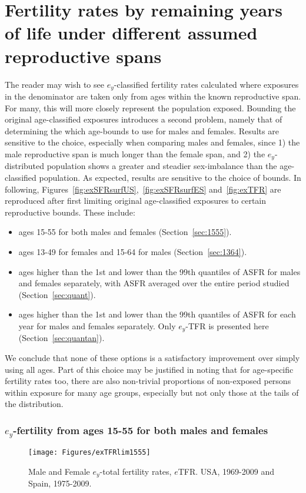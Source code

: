 % 

\chapter{Fertility rates by remaining years of life under different assumed
reproductive spans}
\label{Appendix:reprospans}
The reader may wish to see $e_y$-classified fertility rates calculated
where exposures in the denominator are taken only from ages within the known
reproductive span. For many, this will more closely represent the population exposed. Bounding the
original age-classified exposures introduces a second problem, namely that of
determining the which age-bounds to use for males and females. Results are
sensitive to the choice, especially when comparing males and females, since 1)
the male reproductive span is much longer than the female span, and 2) the
$e_y$-distributed population shows a greater and steadier sex-imbalance than the
age-classified population. As expected, results are sensitive to the choice of
bounds. In following, Figures~\ref{fig:exSFRsurfUS},~\ref{fig:exSFRsurfES}
and~\ref{fig:exTFR} are reproduced after first limiting original
age-classified exposures to certain reproductive bounds. These include:

\begin{itemize}
  \item ages 15-55 for both males and females (Section~\ref{sec:1555}).
  \item ages 13-49 for females and 15-64 for males (Section~\ref{sec:1364}).
  \item ages higher than the 1st and lower than the 99th
  quantiles of ASFR for males and females separately, with ASFR averaged over the entire period
  studied (Section~\ref{sec:quant}).
  \item ages higher than the 1st and lower than the
  99th quantiles of ASFR for each year for males and females separately. Only
  $e_y$-TFR is presented here (Section~\ref{sec:quantan}).
\end{itemize}

We conclude that none of these options is a satisfactory improvement over simply
using all ages. Part of this choice may be justified in noting that for
age-specific fertility rates too, there are also non-trivial proportions of
non-exposed persons within exposure for many age groups, especially but not only
those at the tails of the distribution.
\pagebreak

\subsection{$e_y$-fertility from ages 15-55 for both males and females}
\begin{figure}[ht!]
        \centering  
          \caption{Male and Female $e_y$-total fertility rates, $e$TFR. USA, 1969-2009 and Spain, 1975-2009.}
           \texttt{[image: Figures/exTFRlim1555]}
          \label{fig:exTFRlim15_55}
\end{figure}

